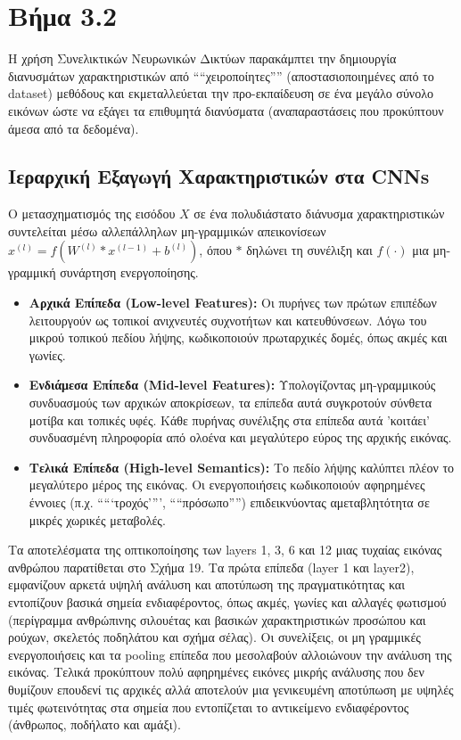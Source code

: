 \documentclass[12pt,a4paper]{article}
\begin{document}
\section*{Βήμα 3.2}

\hspace{0.6cm}Η χρήση Συνελικτικών Νευρωνικών Δικτύων παρακάμπτει την δημιουργία διανυσμάτων χαρακτηριστικών από ````χειροποίητες'''' (αποστασιοποιημένες από το \foreignlanguage{english}{dataset}) μεθόδους και εκμεταλλεύεται την προ-εκπαίδευση σε ένα μεγάλο σύνολο εικόνων ώστε να εξάγει τα επιθυμητά διανύσματα (αναπαραστάσεις που προκύπτουν άμεσα από τα δεδομένα).

\subsection*{Ιεραρχική Εξαγωγή Χαρακτηριστικών στα \foreignlanguage{english}{CNNs}}
\hspace{0.6cm}Ο μετασχηματισμός της εισόδου $X$ σε ένα πολυδιάστατο διάνυσμα χαρακτηριστικών συντελείται μέσω αλλεπάλληλων μη-γραμμικών απεικονίσεων $x^{(l)} = f(W^{(l)} * x^{(l-1)} + b^{(l)})$, όπου $*$ δηλώνει τη συνέλιξη και $f(\cdot)$ μια μη-γραμμική συνάρτηση ενεργοποίησης. 

\begin{itemize}
    \item \textbf{Αρχικά Επίπεδα (\foreignlanguage{english}{Low-level Features)}:} Οι πυρήνες των πρώτων επιπέδων λειτουργούν ως τοπικοί ανιχνευτές συχνοτήτων και κατευθύνσεων. Λόγω του μικρού τοπικού πεδίου λήψης, κωδικοποιούν πρωταρχικές δομές, όπως ακμές και γωνίες.
    \item \textbf{Ενδιάμεσα Επίπεδα (\foreignlanguage{english}{Mid-level Features)}:} Υπολογίζοντας μη-γραμμικούς συνδυασμούς των αρχικών αποκρίσεων, τα επίπεδα αυτά συγκροτούν σύνθετα μοτίβα και τοπικές υφές. Κάθε πυρήνας συνέλιξης στα επίπεδα αυτά 'κοιτάει' συνδυασμένη πληροφορία από ολοένα και μεγαλύτερο εύρος της αρχικής εικόνας.
    \item \textbf{Τελικά Επίπεδα (\foreignlanguage{english}{High-level Semantics}):} Το πεδίο λήψης καλύπτει πλέον το μεγαλύτερο μέρος της εικόνας. Οι ενεργοποιήσεις κωδικοποιούν αφηρημένες έννοιες (π.χ. `````τροχός'''', ````πρόσωπο'''') επιδεικνύοντας αμεταβλητότητα σε μικρές χωρικές μεταβολές.
\end{itemize}

Τα αποτελέσματα της οπτικοποίησης των \foreignlanguage{english}{layers} 1, 3, 6 και 12 μιας τυχαίας εικόνας ανθρώπου παρατίθεται στο Σχήμα 19. Τα πρώτα επίπεδα (\foreignlanguage{english}{layer} 1 και  \foreignlanguage{english}{layer2}), εμφανίζουν αρκετά υψηλή ανάλυση και αποτύπωση της πραγματικότητας και εντοπίζουν βασικά σημεία ενδιαφέροντος, όπως ακμές, γωνίες και αλλαγές φωτισμού (περίγραμμα ανθρώπινης σιλουέτας και βασικών χαρακτηριστικών προσώπου και ρούχων, σκελετός ποδηλάτου και σχήμα σέλας). Οι συνελίξεις, οι μη γραμμικές ενεργοποιήσεις και τα \foreignlanguage{english}{pooling} επίπεδα που μεσολαβούν αλλοιώνουν την ανάλυση της εικόνας. Τελικά προκύπτουν πολύ αφηρημένες εικόνες μικρής ανάλυσης που δεν θυμίζουν επουδενί τις αρχικές αλλά αποτελούν μια γενικευμένη αποτύπωση με υψηλές τιμές φωτεινότητας στα σημεία που εντοπίζεται το αντικείμενο ενδιαφέροντος (άνθρωπος, ποδήλατο και αμάξι).
\end{document}
